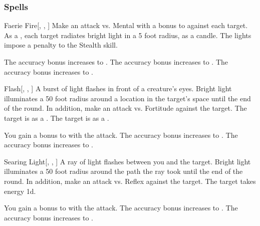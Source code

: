 \subsubsection{Spells}


\lowercase{\hypertarget{spell:Faerie Fire}{}}\label{spell:Faerie Fire}
\begin{freeability}[Rank 1]{\hypertarget{spell:Faerie Fire}{Faerie Fire}}[, , ]
Make an attack vs. Mental with a  bonus to  against each target.
\hit As a , each target radiates bright light in a 5 foot radius, as a candle.
The lights impose a  penalty to the Stealth skill.

\rankline
{} The accuracy bonus increases to .
 The accuracy bonus increases to .
 The accuracy bonus increases to .
\end{freeability}
\vspace{0.25em}



\lowercase{\hypertarget{spell:Flash}{}}\label{spell:Flash}
\begin{freeability}[Rank 1]{\hypertarget{spell:Flash}{Flash}}[, , ]
A burst of light flashes in front of a creature's eyes.
Bright light illuminates a 50 foot radius around a location in the target's space until the end of the round.
In addition, make an attack vs. Fortitude against the target.
\hit The target is  as a .
\crit The target is  as a .

\rankline
{} You gain a  bonus to  with the attack.
 The accuracy bonus increases to .
 The accuracy bonus increases to .
\end{freeability}
\vspace{0.25em}



\lowercase{\hypertarget{spell:Searing Light}{}}\label{spell:Searing Light}
\begin{freeability}[Rank 1]{\hypertarget{spell:Searing Light}{Searing Light}}[, , ]
A ray of light flashes between you and the target.
Bright light illuminates a 50 foot radius around the path the ray took until the end of the round.
In addition, make an attack vs. Reflex against the target.
\hit The target takes energy  \plus1d.

\rankline
{} You gain a  bonus to  with the attack.
 The accuracy bonus increases to .
 The accuracy bonus increases to .
\end{freeability}
\vspace{0.25em}



